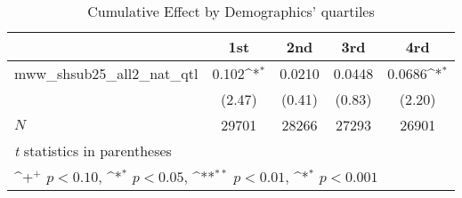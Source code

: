 \begin{table}[htbp]\centering
\def\sym#1{\ifmmode^{#1}\else\(^{#1}\)\fi}
\caption{Cumulative Effect by Demographics' quartiles}
\begin{tabular}{l*{4}{c}}
\hline\hline
            &\multicolumn{1}{c}{1st}&\multicolumn{1}{c}{2nd}&\multicolumn{1}{c}{3rd}&\multicolumn{1}{c}{4rd}\\
\hline
mww\_shsub25\_all2\_nat\_qtl&       0.102\sym{*}&      0.0210       &      0.0448       &      0.0686\sym{*}\\
            &      (2.47)       &      (0.41)       &      (0.83)       &      (2.20)       \\
\hline
\(N\)       &       29701       &       28266       &       27293       &       26901       \\
\hline\hline
\multicolumn{5}{l}{\footnotesize \textit{t} statistics in parentheses}\\
\multicolumn{5}{l}{\footnotesize \sym{+} \(p<0.10\), \sym{*} \(p<0.05\), \sym{**} \(p<0.01\), \sym{*} \(p<0.001\)}\\
\end{tabular}
\end{table}
